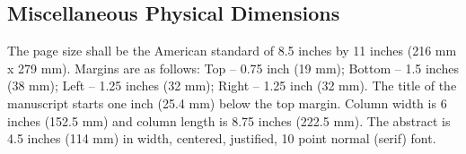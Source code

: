 \documentclass[letterpaper, preprint, paper,11pt]{AAS}	%
\begin{document}
\subsection*{Miscellaneous Physical Dimensions}
The page size shall be the American standard of 8.5 inches by 11 inches (216 mm x 279 mm). Margins are as follows: Top -- 0.75 inch (19 mm); Bottom -- 1.5 inches (38 mm); Left -- 1.25 inches (32 mm); Right -- 1.25 inch (32 mm). The title of the manuscript starts one inch (25.4 mm) below the top margin. Column width is 6 inches (152.5 mm) and column length is 8.75 inches (222.5 mm). The abstract is 4.5 inches (114 mm) in width, centered, justified, 10 point normal (serif) font.


\end{document}
